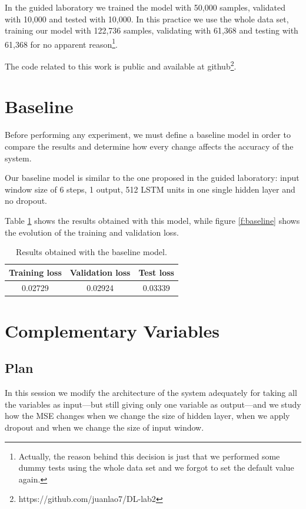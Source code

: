 \documentclass[]{article}
\begin{document}
	In the guided laboratory we trained the model with 50,000 samples, validated with 10,000 and tested with 10,000. In this practice we use the whole data set, training our model with 122,736 samples, validating with 61,368 and testing with 61,368 for no apparent reason\footnote{Actually, the reason behind this decision is just that we performed some dummy tests using the whole data set and we forgot to set the default value again.}.
	
	The code related to this work is public and available at github\footnote{https://github.com/juanlao7/DL-lab2}.
	
	\section{Baseline}
	
	Before performing any experiment, we must define a baseline model in order to compare the results and determine how every change affects the accuracy of the system.
	
	Our baseline model is similar to the one proposed in the guided laboratory: input window size of 6 steps, 1 output, 512 LSTM units in one single hidden layer and no dropout.
	
	Table \ref{t:baseline} shows the results obtained with this model, while figure \ref{f:baseline} shows the evolution of the training and validation loss.
	
	\begin{table}[H]
		\centering
		\begin{tabular}{@{}ccc@{}}
			\toprule
			Training loss & Validation loss & Test loss \\ \midrule
			0.02729       & 0.02924         & 0.03339   \\ \bottomrule
		\end{tabular}
		\caption{Results obtained with the baseline model.}
		\label{t:baseline}
	\end{table}
	
	\section{Complementary Variables}
	
	\subsection{Plan}
	
	In this session we modify the architecture of the system adequately for taking all the variables as input---but still giving only one variable as output---and we study how the MSE changes when we change the size of hidden layer, when we apply dropout and when we change the size of input window.
	
\end{document}
